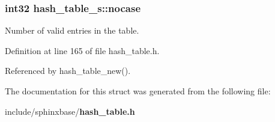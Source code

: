 \subsubsection[{nocase}]{\setlength{\rightskip}{0pt plus 5cm}int32 hash\+\_\+table\+\_\+s\+::nocase}\label{structhash__table__s_a1d1f5dbf52075c0424596ec492e2614d}


Number of valid entries in the table. 



Definition at line 165 of file hash\+\_\+table.\+h.



Referenced by hash\+\_\+table\+\_\+new().



The documentation for this struct was generated from the following file\+:\begin{DoxyCompactItemize}
\item 
include/sphinxbase/{\bf hash\+\_\+table.\+h}\end{DoxyCompactItemize}
